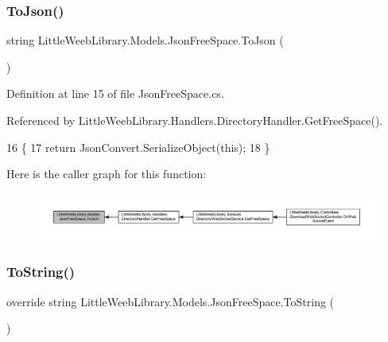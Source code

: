 \subsubsection{\texorpdfstring{To\+Json()}{ToJson()}}
{\footnotesize\ttfamily string Little\+Weeb\+Library.\+Models.\+Json\+Free\+Space.\+To\+Json (\begin{DoxyParamCaption}{ }\end{DoxyParamCaption})}



Definition at line 15 of file Json\+Free\+Space.\+cs.



Referenced by Little\+Weeb\+Library.\+Handlers.\+Directory\+Handler.\+Get\+Free\+Space().


\begin{DoxyCode}
16         \{
17             \textcolor{keywordflow}{return} JsonConvert.SerializeObject(\textcolor{keyword}{this});
18         \}
\end{DoxyCode}
Here is the caller graph for this function\+:\nopagebreak
\begin{figure}[H]
\begin{center}
\leavevmode
\includegraphics[width=350pt]{class_little_weeb_library_1_1_models_1_1_json_free_space_a3ab3c947402838a29e33684edaf16a54_icgraph}
\end{center}
\end{figure}
\mbox{\label{class_little_weeb_library_1_1_models_1_1_json_free_space_ab23fb33c2e1990fc09fb171193bee852}} 
\subsubsection{\texorpdfstring{To\+String()}{ToString()}}
{\footnotesize\ttfamily override string Little\+Weeb\+Library.\+Models.\+Json\+Free\+Space.\+To\+String (\begin{DoxyParamCaption}{ }\end{DoxyParamCaption})}



